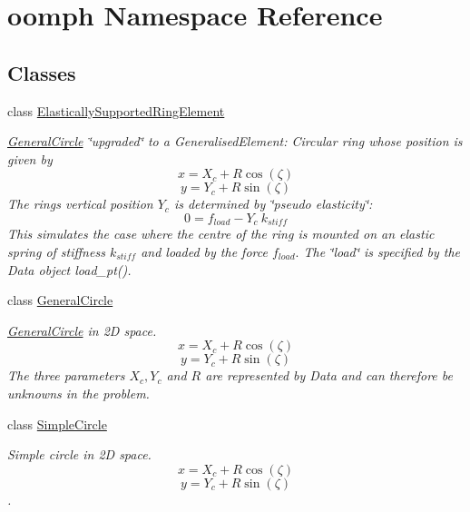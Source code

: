 \hypertarget{namespaceoomph}{}\section{oomph Namespace Reference}
\label{namespaceoomph}
\subsection*{Classes}
\begin{DoxyCompactItemize}
\item 
class \hyperlink{classoomph_1_1ElasticallySupportedRingElement}{Elastically\+Supported\+Ring\+Element}
\begin{DoxyCompactList}\small\item\em \hyperlink{classoomph_1_1GeneralCircle}{General\+Circle} \char`\"{}upgraded\char`\"{} to a Generalised\+Element\+: Circular ring whose position is given by \[ x = X_c + R \cos(\zeta) \] \[ y = Y_c + R \sin(\zeta) \] The ring\textquotesingle{}s vertical position $ Y_c $ is determined by \char`\"{}pseudo elasticity\char`\"{}\+: \[ 0 = f_{load} - Y_c \ k_{stiff} \] This simulates the case where the centre of the ring is mounted on an elastic spring of stiffness $ k_{stiff} $ and loaded by the force $ f_{load}. $ The \char`\"{}load\char`\"{} is specified by the Data object {\ttfamily load\+\_\+pt()}. \end{DoxyCompactList}\item 
class \hyperlink{classoomph_1_1GeneralCircle}{General\+Circle}
\begin{DoxyCompactList}\small\item\em \hyperlink{classoomph_1_1GeneralCircle}{General\+Circle} in 2D space. \[ x = X_c + R \cos(\zeta) \] \[ y = Y_c + R \sin(\zeta) \] The three parameters $ X_c, Y_c $ and $ R $ are represented by Data and can therefore be unknowns in the problem. \end{DoxyCompactList}\item 
class \hyperlink{classoomph_1_1SimpleCircle}{Simple\+Circle}
\begin{DoxyCompactList}\small\item\em Simple circle in 2D space. \[ x = X_c + R \cos(\zeta) \] \[ y = Y_c + R \sin(\zeta) \]. \end{DoxyCompactList}\end{DoxyCompactItemize}

